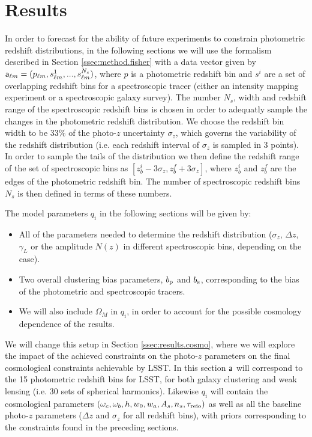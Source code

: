 \documentclass[prd,twocolumn]{revtex4}
\begin{document}
\section{Results} \label{sec:results}
  In order to forecast for the ability of future experiments to constrain photometric
  redshift distributions, in the following sections we will use the formalism 
  described in Section \ref{ssec:method.fisher} with a data vector given by
  ${\sf a}_{\ell m}=(p_{\ell m},s^1_{\ell m},...,s^{N_s}_{\ell m})$, where $p$ is
  a photometric redshift bin and $s^i$ are a set of overlapping redshift bins for
  a spectroscopic tracer (either an intensity mapping experiment or a spectroscopic
  galaxy survey). The number $N_s$, width and redshift range of the spectroscopic
  redshift bins is chosen in order to adequatly sample the changes in the photometric
  redshift distribution. We choose the redshift bin width to be $33\%$ of the
  photo-$z$ uncertainty $\sigma_z$, which governs the variability of the redshift
  distribution (i.e. each redshift interval of $\sigma_z$ is sampled in 3 points).
  In order to sample the tails of the distribution we then define the redshift 
  range of the set of spectroscopic bins as $[z_b^i-3\sigma_z,z_b^f+3\sigma_z]$,
  where $z_b^i$ and $z_b^f$ are the edges of the photometric redshift bin. The
  number of spectroscopic redshift bins $N_s$ is then defined in terms of these
  numbers.
  
  The model parameters $q_i$ in the following sections will be given by:
  \begin{itemize}
    \item All of the parameters needed to determine the redshift distribution
          ($\sigma_z$, $\Delta z$, $\gamma_L$ or the amplitude $N(z)$ in different
          spectroscopic bins, depending on the case).
    \item Two overall clustering bias parameters, $b_{\rm p}$ and $b_{\rm s}$,
          corresponding to the bias of the photometric and spectroscopic tracers.
    \item We will also include $\Omega_M$ in $q_i$, in order to account for the
          possible cosmology dependence of the results.
  \end{itemize}
  
  We will change this setup in Section \ref{ssec:results.cosmo}, where we will
  explore the impact of the achieved constraints on the photo-$z$ parameters on
  the final cosmological constraints achievable by LSST. In this section
  ${\sf a}$ will correspond to the 15 photometric redshift bins for LSST, for
  both galaxy clustering and weak lensing (i.e. 30 sets of spherical harmonics).
  Likewise $q_i$ will contain the cosmological parameters
  $(\omega_c,\omega_b,h,w_0,w_a,A_s,n_s,\tau_{\rm reio})$ as well as all the
  baseline photo-$z$ parameters ($\Delta z$ and $\sigma_z$ for all redshift
  bins), with priors corresponding to the constraints found in the preceding
  sections.
\end{document}
